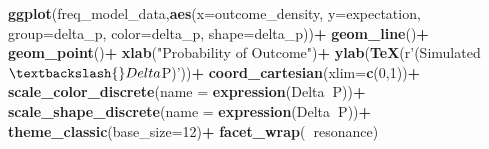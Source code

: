 \documentclass[
  english,
  man,floatsintext]{apa6}
\newenvironment{Shaded}{\begin{snugshade}}{\end{snugshade}}
\newcommand{\KeywordTok}[1]{\textcolor[rgb]{0.13,0.29,0.53}{\textbf{#1}}}
\newcommand{\DataTypeTok}[1]{\textcolor[rgb]{0.13,0.29,0.53}{#1}}
\newcommand{\DecValTok}[1]{\textcolor[rgb]{0.00,0.00,0.81}{#1}}
\newcommand{\StringTok}[1]{\textcolor[rgb]{0.31,0.60,0.02}{#1}}
\newcommand{\OperatorTok}[1]{\textcolor[rgb]{0.81,0.36,0.00}{\textbf{#1}}}
\newcommand{\NormalTok}[1]{#1}
\begin{document}
\begin{appendix}
\begin{Shaded}
\begin{Highlighting}[]
\KeywordTok{ggplot}\NormalTok{(freq_model_data,}\KeywordTok{aes}\NormalTok{(}\DataTypeTok{x=}\NormalTok{outcome_density,}
\DataTypeTok{y=}\NormalTok{expectation,}
\DataTypeTok{group=}\NormalTok{delta_p,}
\DataTypeTok{color=}\NormalTok{delta_p,}
\DataTypeTok{shape=}\NormalTok{delta_p))}\OperatorTok{+}
\StringTok{  }\KeywordTok{geom_line}\NormalTok{()}\OperatorTok{+}
\StringTok{  }\KeywordTok{geom_point}\NormalTok{()}\OperatorTok{+}
\StringTok{  }\KeywordTok{xlab}\NormalTok{(}\StringTok{"Probability of Outcome"}\NormalTok{)}\OperatorTok{+}
\StringTok{  }\KeywordTok{ylab}\NormalTok{(}\KeywordTok{TeX}\NormalTok{(r}\StringTok{'(Simulated $\textbackslash{}Delta$P)'}\NormalTok{))}\OperatorTok{+}
\StringTok{  }\KeywordTok{coord_cartesian}\NormalTok{(}\DataTypeTok{xlim=}\KeywordTok{c}\NormalTok{(}\DecValTok{0}\NormalTok{,}\DecValTok{1}\NormalTok{))}\OperatorTok{+}
\StringTok{  }\KeywordTok{scale_color_discrete}\NormalTok{(}\DataTypeTok{name =} \KeywordTok{expression}\NormalTok{(Delta}\OperatorTok{~}\NormalTok{P))}\OperatorTok{+}
\StringTok{  }\KeywordTok{scale_shape_discrete}\NormalTok{(}\DataTypeTok{name =} \KeywordTok{expression}\NormalTok{(Delta}\OperatorTok{~}\NormalTok{P))}\OperatorTok{+}
\StringTok{  }\KeywordTok{theme_classic}\NormalTok{(}\DataTypeTok{base_size=}\DecValTok{12}\NormalTok{)}\OperatorTok{+}
\StringTok{  }\KeywordTok{facet_wrap}\NormalTok{(}\OperatorTok{~}\NormalTok{resonance)}
\end{Highlighting}
\end{Shaded}

\end{appendix}
\end{document}
